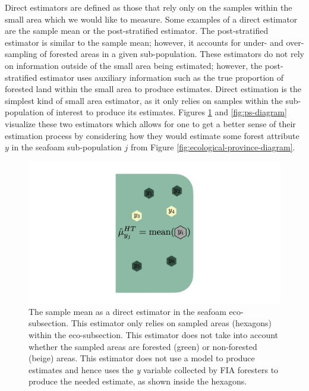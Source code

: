 \documentclass[12pt,twoside]{reedthesis}
\begin{document}
Direct estimators are defined as those that rely only on the samples within the small area which we would like to measure. Some examples of a direct estimator are the sample mean or the post-stratified estimator. The post-stratified estimator is similar to the sample mean; however, it accounts for under- and over-sampling of forested areas in a given sub-population. These estimators do not rely on information outside of the small area being estimated; however, the post-stratified estimator uses auxiliary information such as the true proportion of forested land within the small area to produce estimates. Direct estimation is the simplest kind of small area estimator, as it only relies on samples within the sub-population of interest to produce its estimates. Figures \ref{fig:mean-diagram} and \ref{fig:ps-diagram} visualize these two estimators which allows for one to get a better sense of their estimation process by considering how they would estimate some forest attribute \(y\) in the seafoam sub-population \(j\) from Figure \ref{fig:ecological-province-diagram}.
\begin{figure}

{\centering \includegraphics[width=1\linewidth]{figure/mean-diagram} 

}

\caption[The sample mean as a direct estimator]{The sample mean as a direct estimator in the seafoam eco-subsection. This estimator only relies on sampled areas (hexagons) within the eco-subsection. This estimator does not take into account whether the sampled areas are forested (green) or non-forested (beige) areas. This estimator does not use a model to produce estimates and hence uses the \textit{y} variable collected by FIA foresters to produce the needed estimate, as shown inside the hexagons.}\label{fig:mean-diagram}
\end{figure}
\end{document}
